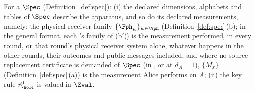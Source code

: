 \begin{assumption}\label{ass:spec}
For a  $\Spec$ (Definition~\ref{def:spec}):
(i) the declared dimensions, alphabets and tables of $\Spec$ describe the
apparatus, and so do its declared measurements, namely: the physical
receiver family $\{\Fph_w\}_{w\in\Vph}$ (Definition~\ref{def:spec}\,(b); in
the general format, each 's family of (b$'$)) is the
measurement performed, in every round, on that round's physical receiver
system alone, whatever happens in the other rounds, their outcomes and public
messages included; and
where no source-replacement certificate is demanded of $\Spec$ (in
, or at $d_A=1$), $\{M_x\}$
(Definition~\ref{def:spec}\,(a)) is the measurement Alice performs on $A$;
(ii) the key rule $r^{0}_{\hold}$ is valued in $\Zval$.
\end{assumption}

